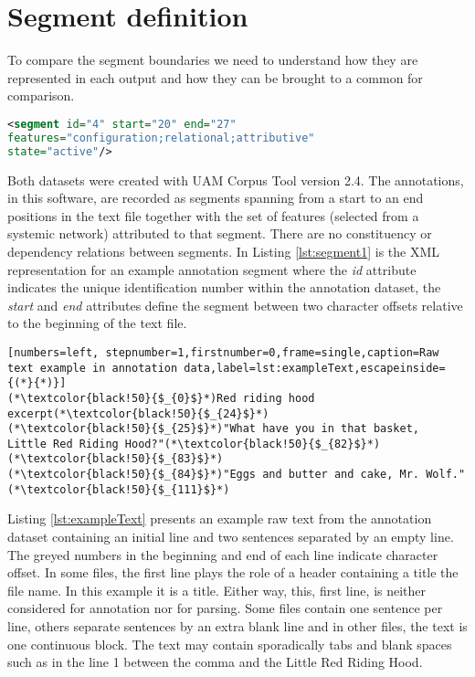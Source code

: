 \section{Segment definition}
To compare the segment boundaries we need to understand how they are represented in each output and how they can be brought to a common for comparison. 

\begin{lstlisting}[language=XML,frame=single,caption=Segment example in UAM corpus tool,label=lst:segment1]
<segment id="4" start="20" end="27" 
features="configuration;relational;attributive" 
state="active"/>
\end{lstlisting}

Both datasets were created with UAM Corpus Tool \citep{ODonnell2008,ODonnell2008a} version 2.4. The annotations, in this software, are recorded as segments spanning from a start to an end positions in the text file together with the set of features (selected from a systemic network) attributed to that segment. There are no constituency or dependency relations between segments. In Listing \ref{lst:segment1} is the XML representation for an example annotation segment where the \textit{id} attribute indicates the unique identification number within the annotation dataset, the \textit{start} and \textit{end} attributes define the segment between two character offsets relative to the beginning of the text file. 

\begin{lstlisting}[numbers=left, stepnumber=1,firstnumber=0,frame=single,caption=Raw text example in annotation data,label=lst:exampleText,escapeinside={(*}{*)}]
(*\textcolor{black!50}{$_{0}$}*)Red riding hood excerpt(*\textcolor{black!50}{$_{24}$}*)
(*\textcolor{black!50}{$_{25}$}*)"What have you in that basket,   Little Red Riding Hood?"(*\textcolor{black!50}{$_{82}$}*)
(*\textcolor{black!50}{$_{83}$}*)
(*\textcolor{black!50}{$_{84}$}*)"Eggs and butter and cake, Mr. Wolf."(*\textcolor{black!50}{$_{111}$}*)
\end{lstlisting}

Listing \ref{lst:exampleText} presents an example raw text from the annotation dataset containing an initial line and two sentences separated by an empty line. The greyed numbers in the beginning and end of each line indicate character offset. In some files, the first line plays the role of a header containing a title the file name. In this example it is a title. Either way, this, first line, is neither considered for annotation nor for parsing. Some files contain one sentence per line, others separate sentences by an extra blank line and in other files, the text is one continuous block. The text may  contain sporadically tabs and blank spaces such as in the line 1 between the comma and the Little Red Riding Hood. 

